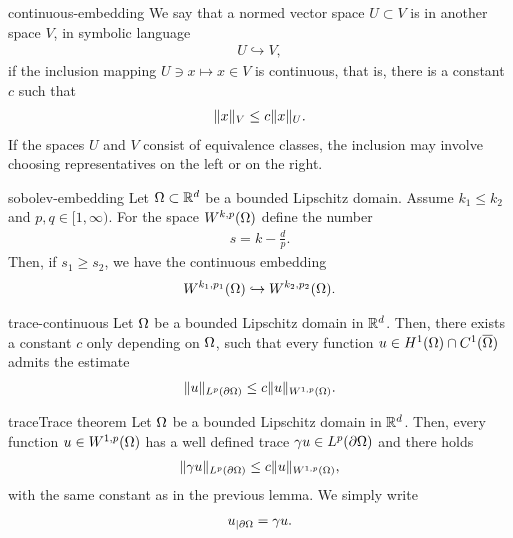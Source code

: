 \begin{Definition}{continuous-embedding}
  We say that a normed vector space $U \subset V$ is
   in another space $V$, in symbolic
  language
  \begin{gather}
    U \hookrightarrow V,
  \end{gather}
  if the inclusion mapping $U \ni x \mapsto x\in V$ is continuous, that is, there is a constant $c$ such that
  \begin{gather}
    \lVert x\rVert_V \le c \lVert x\rVert_U.
  \end{gather}
  If the spaces $U$ and $V$ consist of equivalence classes, the
  inclusion may involve choosing representatives on the left or on the
  right.
\end{Definition}

\begin{Theorem}{sobolev-embedding}
  Let $\Omega\subset\mathbb R^d$ be a bounded Lipschitz domain. Assume
  $k_1 \le k_2$ and $p,q\in [1,\infty)$. For the space
  $W^{k,p}(\Omega)$ define the number
  \begin{gather}
    s = k-\tfrac dp.
  \end{gather}
  Then, if $s_1 \ge s_2$, we have the continuous embedding
  \begin{gather}
    W^{k_1,p_1}(\Omega) \hookrightarrow  W^{k_2,p_2}(\Omega).
  \end{gather}
\end{Theorem}

\begin{Lemma}{trace-continuous}
  Let $\Omega$ be a bounded Lipschitz domain in $\mathbb R^d$. Then, there
  exists a constant $c$ only depending on $\Omega$, such that every
  function $u\in H^1(\Omega) \cap C^1(\overline{\Omega})$ admits the
  estimate
  \begin{gather}
    \lVert u\rVert_{L^p(\partial\Omega)} \le c \lVert u\rVert_{W^{1,p}(\Omega)}.
  \end{gather}
\end{Lemma}

\begin{Theorem*}{trace}{Trace theorem}
  Let $\Omega$ be a bounded Lipschitz domain in $\mathbb R^d$. Then, every
  function $u\in W^{1,p}(\Omega)$ has a well defined trace
  $\gamma u \in L^p(\partial\Omega)$ and there holds
  \begin{gather}
    \lVert\gamma u\rVert_{L^p(\partial\Omega)} \le c \lVert u\rVert_{W^{1,p}(\Omega)},
  \end{gather}
  with the same constant as in the previous lemma. We simply write
  \begin{gather}
    u_{|\partial\Omega} = \gamma u.
  \end{gather}
\end{Theorem*}

